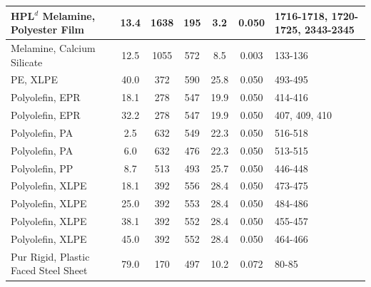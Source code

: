\begin{table}[!h]
\begin{tabular}{|l|c|c|c|c|c|p{3.7cm}|}
HPL$^d$ Melamine, Polyester Film                  & 13.4 & 1638 & 195 & 3.2  & 0.050 & 1716-1718, 1720-1725, 2343-2345 \\\hline
Melamine, Calcium Silicate                        & 12.5 & 1055 & 572 & 8.5  & 0.003 & 133-136 \\\hline
PE, XLPE                                          & 40.0 & 372  & 590 & 25.8 & 0.050 & 493-495 \\\hline
Polyolefin, EPR                                   & 18.1 & 278  & 547 & 19.9 & 0.050 & 414-416 \\\hline
Polyolefin, EPR                                   & 32.2 & 278  & 547 & 19.9 & 0.050 & 407, 409, 410 \\\hline
Polyolefin, PA                                    & 2.5  & 632  & 549 & 22.3 & 0.050 & 516-518 \\\hline
Polyolefin, PA                                    & 6.0  & 632  & 476 & 22.3 & 0.050 & 513-515 \\\hline
Polyolefin, PP                                    & 8.7  & 513  & 493 & 25.7 & 0.050 & 446-448 \\\hline
Polyolefin, XLPE                                  & 18.1 & 392 & 556 & 28.4 & 0.050 & 473-475 \\\hline
Polyolefin, XLPE                                  & 25.0 & 392 & 553 & 28.4 & 0.050 & 484-486 \\\hline
Polyolefin, XLPE                                  & 38.1 & 392 & 552 & 28.4 & 0.050 & 455-457 \\\hline
Polyolefin, XLPE                                  & 45.0 & 392 & 552 & 28.4 & 0.050 & 464-466 \\\hline
Pur Rigid, Plastic Faced Steel Sheet              & 79.0 & 170 & 497 & 10.2 & 0.072 & 80-85 \\\hline
\end{tabular}
\label{Properties_RISE_Materials_Mixtures1}
\end{table}
\vspace{-0.4cm}
\\
\\
\\
\\

